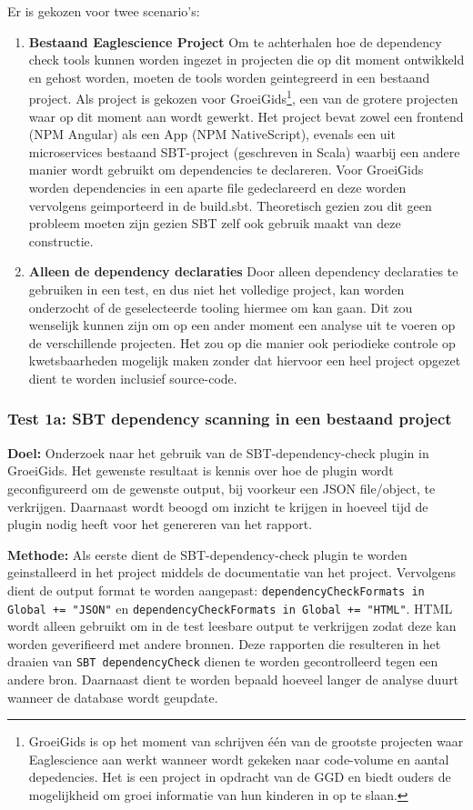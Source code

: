 \begin{itemize}
    Er is gekozen voor twee scenario's:
    \begin{enumerate}
        \item \textbf{Bestaand Eaglescience Project} Om te achterhalen hoe de dependency check tools kunnen worden ingezet in projecten die op dit moment ontwikkeld en gehost worden, moeten de tools worden geintegreerd in een bestaand project. Als project is gekozen voor GroeiGids\footnote{GroeiGids is op het moment van schrijven één van de grootste projecten waar Eaglescience aan werkt wanneer wordt gekeken naar code-volume en aantal depedencies. Het is een project in opdracht van de GGD en biedt ouders de mogelijkheid om groei informatie van hun kinderen in op te slaan.}, een van de grotere projecten waar op dit moment aan wordt gewerkt. Het project bevat zowel een frontend (NPM Angular) als een App (NPM NativeScript), evenals een uit microservices bestaand SBT-project (geschreven in Scala) waarbij een andere manier wordt gebruikt om dependencies te declareren. Voor GroeiGids worden dependencies in een aparte file gedeclareerd en deze worden vervolgens geimporteerd in de build.sbt. Theoretisch gezien zou dit geen probleem moeten zijn gezien SBT zelf ook gebruik maakt van deze constructie.

        \item \textbf{Alleen de dependency declaraties} Door alleen dependency declaraties te gebruiken in een test, en dus niet het volledige project, kan worden onderzocht of de geselecteerde tooling hiermee om kan gaan. Dit zou wenselijk kunnen zijn om op een ander moment een analyse uit te voeren op de verschillende projecten. Het zou op die manier ook periodieke controle op kwetsbaarheden mogelijk maken zonder dat hiervoor een heel project opgezet dient te worden inclusief source-code.
    \end{enumerate}

    \subsubsection{Test 1a: SBT dependency scanning in een bestaand project}
    \textbf{Doel:} Onderzoek naar het gebruik van de SBT-dependency-check plugin in GroeiGids. Het gewenste resultaat is kennis over hoe de plugin wordt geconfigureerd om de gewenste output, bij voorkeur een JSON file/object, te verkrijgen. Daarnaast wordt beoogd om inzicht te krijgen in hoeveel tijd de plugin nodig heeft voor het genereren van het rapport.

    \textbf{Methode:} Als eerste dient de SBT-dependency-check plugin te worden geinstalleerd in het project middels de documentatie van het project. Vervolgens dient de output format te worden aangepast: \texttt{dependencyCheckFormats in Global += "JSON"}
    en \texttt{dependencyCheckFormats in Global += "HTML"}. HTML wordt alleen gebruikt om in de test leesbare output te verkrijgen zodat deze kan worden geverifieerd met andere bronnen. Deze rapporten die resulteren in het draaien van \texttt{SBT dependencyCheck} dienen te worden gecontrolleerd tegen een andere bron. Daarnaast dient te worden bepaald hoeveel langer de analyse duurt wanneer de database wordt geupdate.


\end{itemize}

